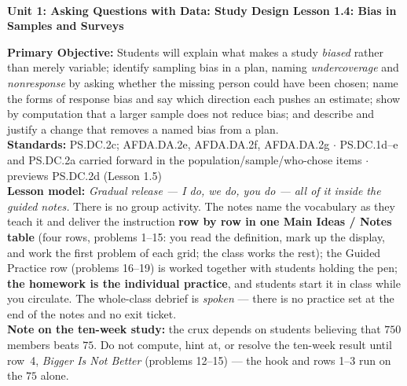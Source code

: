 \documentclass[10pt]{article}
\newcommand{\UnitNumberName}{Unit 1: Asking Questions with Data: Study Design \quad}
\newcommand{\LessonNumberName}{Lesson 1.4: Bias in Samples and Surveys}
\begin{document}
\begin{center}
    {\Large\bfseries \CourseName \\
    {\small\bfseries \UnitNumberName \LessonNumberName}}
\end{center}

\begin{tcolorbox}[colback=frost, colframe=cerulean, boxrule=0.9pt, arc=2mm,
    left=2mm, right=2mm, top=1.5mm, bottom=1.5mm]
    \textbf{Primary Objective:} Students will explain what makes a study \emph{biased} rather
    than merely variable; identify sampling bias in a plan, naming \emph{undercoverage} and
    \emph{nonresponse} by asking whether the missing person could have been chosen; name the
    forms of response bias and say which direction each pushes an estimate; show by
    computation that a larger sample does not reduce bias; and describe and justify a change
    that removes a named bias from a plan.
    \\[2pt]
    \textbf{Standards:} PS.DC.2c; AFDA.DA.2e, AFDA.DA.2f, AFDA.DA.2g \quad$\cdot$\quad
    PS.DC.1d--e and PS.DC.2a carried forward in the population/sample/who-chose items
    \quad$\cdot$\quad previews PS.DC.2d (Lesson 1.5)
    \\[2pt]
    \textbf{Lesson model:} \emph{Gradual release --- I do, we do, you do --- all of it inside
    the guided notes.} There is no group activity. The notes name the vocabulary as they teach
    it and deliver the instruction \textbf{row by row in one Main Ideas / Notes table} (four
    rows, problems 1--15: you read the definition, mark up the display, and work the first
    problem of each grid; the class works the rest); the Guided Practice row (problems 16--19)
    is worked together with students holding the pen; \textbf{the homework is the individual
    practice}, and students start it in class while you circulate. The whole-class debrief is
    \emph{spoken} --- there is no practice set at the end of the notes and no exit ticket.
    \\[2pt]
    \textbf{Note on the ten-week study:} the crux depends on students believing that $750$
    members beats $75$. Do not compute, hint at, or resolve the ten-week result until row~4,
    \emph{Bigger Is Not Better} (problems 12--15) --- the hook and rows 1--3 run on the $75$ alone.
\end{tcolorbox}
\end{document}
